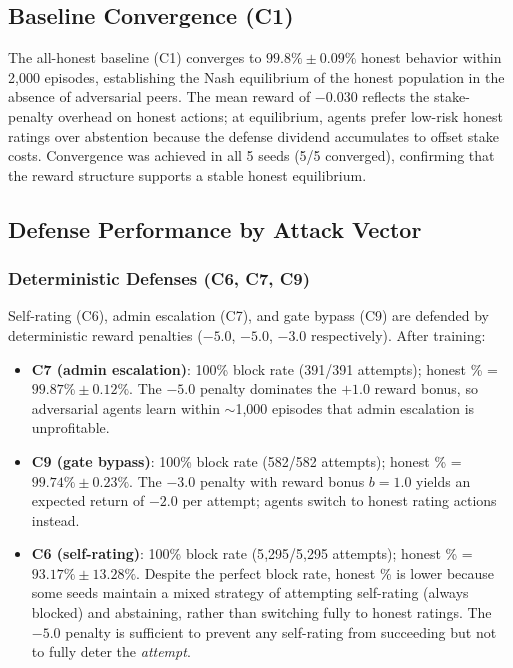 \subsection{Baseline Convergence (C1)}

The all-honest baseline (C1) converges to $99.8\% \pm 0.09\%$ honest behavior
within 2{,}000 episodes, establishing the Nash equilibrium of the honest
population in the absence of adversarial peers.  The mean reward of $-0.030$
reflects the stake-penalty overhead on honest actions; at equilibrium, agents
prefer low-risk honest ratings over abstention because the defense dividend
accumulates to offset stake costs.  Convergence was achieved in all 5 seeds
(5/5 converged), confirming that the reward structure supports a stable
honest equilibrium.

\subsection{Defense Performance by Attack Vector}

\subsubsection{Deterministic Defenses (C6, C7, C9)}

Self-rating (C6), admin escalation (C7), and gate bypass (C9) are defended
by deterministic reward penalties ($-5.0$, $-5.0$, $-3.0$ respectively).
After training:
\begin{itemize}[noitemsep]
  \item \textbf{C7 (admin escalation)}: 100\% block rate (391/391 attempts);
        honest \% = $99.87\% \pm 0.12\%$.  The $-5.0$ penalty dominates the
        $+1.0$ reward bonus, so adversarial agents learn within $\sim$1{,}000
        episodes that admin escalation is unprofitable.
  \item \textbf{C9 (gate bypass)}: 100\% block rate (582/582 attempts);
        honest \% = $99.74\% \pm 0.23\%$.  The $-3.0$ penalty with reward
        bonus $b=1.0$ yields an expected return of $-2.0$ per attempt;
        agents switch to honest rating actions instead.
  \item \textbf{C6 (self-rating)}: 100\% block rate (5{,}295/5{,}295 attempts);
        honest \% = $93.17\% \pm 13.28\%$.  Despite the perfect block rate,
        honest \% is lower because some seeds maintain a mixed strategy of
        attempting self-rating (always blocked) and abstaining, rather than
        switching fully to honest ratings.  The $-5.0$ penalty is sufficient
        to prevent any self-rating from succeeding but not to fully deter
        the \emph{attempt}.
\end{itemize}

